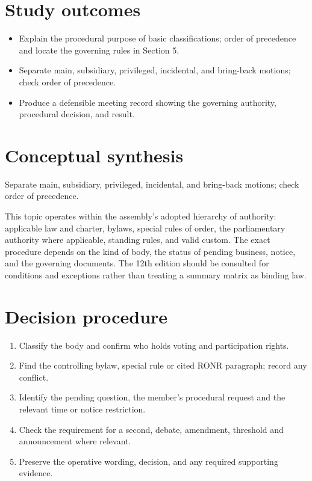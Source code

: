 \documentclass[11pt]{article}
\begin{document}
\SuiteOpen
{}
\section{Study outcomes}
\begin{itemize}[leftmargin=*,itemsep=4pt]
\item Explain the procedural purpose of basic classifications; order of precedence and locate the governing rules in Section 5.
\item Separate main, subsidiary, privileged, incidental, and bring-back motions; check order of precedence.
\item Produce a defensible meeting record showing the governing authority, procedural decision, and result.
\end{itemize}

\section{Conceptual synthesis}
Separate main, subsidiary, privileged, incidental, and bring-back motions; check order of precedence.

This topic operates within the assembly’s adopted hierarchy of authority: applicable law and charter, bylaws, special rules of order, the parliamentary authority where applicable, standing rules, and valid custom. The exact procedure depends on the kind of body, the status of pending business, notice, and the governing documents. The 12th edition should be consulted for conditions and exceptions rather than treating a summary matrix as binding law.
\section{Decision procedure}
\begin{enumerate}[leftmargin=*,itemsep=4pt]
\item Classify the body and confirm who holds voting and participation rights.
\item Find the controlling bylaw, special rule or cited RONR paragraph; record any conflict.
\item Identify the pending question, the member’s procedural request and the relevant time or notice restriction.
\item Check the requirement for a second, debate, amendment, threshold and announcement where relevant.
\item Preserve the operative wording, decision, and any required supporting evidence.
\end{enumerate}
\end{document}
